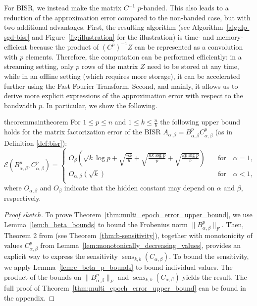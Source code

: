 \documentclass{article} %
\newcommand{\acronym}{BISR\xspace}
\newcommand{\senskb}{\operatorname{sens}_{k, b}}
\begin{document}
For BISR, we instead make the matrix $C^{-1}$ $p$-banded. This also leads to a reduction of the 
approximation error compared to the non-banded case, but with two additional advantages. 
%
First, the resulting algorithm (see Algorithm~\ref{alg:dp-sgd-bisr} and Figure~\ref{fig:illustration} for the illustration) is time- and memory-efficient because the product of $(C^p)^{-1}Z$ can be represented as a convolution with $p$ elements. Therefore, the computation can be performed efficiently: in a streaming setting, only $p$ rows of the matrix $Z$ need to be stored at any time, while in an offline setting (which requires more storage), it can be accelerated further using the Fast Fourier Transform.
%
Second, and mainly, it allows us to derive more explicit expressions of the approximation error with
respect to the bandwidth $p$. In particular, we show the following.

\begin{restatable}[\acronym Approximation Error]{theorem}{maintheorem}
\label{thm:multi_epoch_error_upper_bound}
For $1 \le p \le n$ and $1 \le k \le \frac{n}{b}$ the following upper bound holds for the matrix factorization error 
of the BISR $A_{\alpha, \beta} = B_{\alpha, \beta}^pC_{\alpha, \beta}^p$ (as in Definition \ref{def:bisr}):
\begin{equation}
\mathcal{E}( B_{\alpha, \beta}^p, C_{\alpha, \beta}^{p}) = 
\begin{cases}  O_{\beta}\left(\sqrt{k}\log p + \sqrt{\frac{nk}{b}} + \sqrt{\frac{nk\log p}{p}} + \sqrt{\frac{kp\log p}{b}}\right) \quad &\text{for}  \quad \alpha = 1,\\
O_{\alpha, \beta}(\sqrt{k}) \quad &\text{for}  \quad \alpha < 1,\\
\end{cases}\label{eq:multi_epoch_error_upper_bound}
\end{equation} 
where $O_{\alpha,\beta}$ and $O_{\beta}$ indicate that the hidden constant may depend on $\alpha$ and $\beta$, respectively.
\end{restatable}
\begin{proof}
    [Proof sketch] 
    To prove Theorem~\ref{thm:multi_epoch_error_upper_bound}, we use Lemma~\ref{lem:b_beta_bounds} to bound the Frobenius norm $\|B^{p}_{\alpha, \beta}\|_F$. Then, Theorem 2 from \citet{kalinin2024} (see Theorem~\ref{thm:b-sensitivity}), together with monotonicity of values $C_{\alpha, \beta}^p$ from Lemma~\ref{lem:monotonically_decreasing_values}, provides an explicit way to express the sensitivity $\senskb(C_{\alpha, \beta})$. To bound the sensitivity, we apply Lemma~\ref{lem:c_beta_p_bounds} to bound individual values. The product of the bounds on $\|B^{p}_{\alpha, \beta}\|_F$ and $\senskb(C_{\alpha, \beta})$ yields the result. The full proof of Theorem~\ref{thm:multi_epoch_error_upper_bound} can be found in the appendix.
\end{proof}
\end{document}
